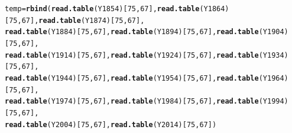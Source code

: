 \documentclass{article}\usepackage[]{graphicx}\usepackage[]{color}
\makeatletter
\newcommand{\hlnum}[1]{\textcolor[rgb]{0.686,0.059,0.569}{#1}}%
\newcommand{\hlstd}[1]{\textcolor[rgb]{0.345,0.345,0.345}{#1}}%
\newcommand{\hlkwb}[1]{\textcolor[rgb]{0.69,0.353,0.396}{#1}}%
\newcommand{\hlkwd}[1]{\textcolor[rgb]{0.737,0.353,0.396}{\textbf{#1}}}%
\newenvironment{kframe}{%
 \def\at@end@of@kframe{}%
 \ifinner\ifhmode%
  \def\at@end@of@kframe{\end{minipage}}%
  \begin{minipage}{\columnwidth}%
 \fi\fi%
 \def\FrameCommand##1{\hskip\@totalleftmargin \hskip-\fboxsep
 \colorbox{shadecolor}{##1}\hskip-\fboxsep
     \hskip-\linewidth \hskip-\@totalleftmargin \hskip\columnwidth}%
 \MakeFramed {\advance\hsize-\width
   \@totalleftmargin\z@ \linewidth\hsize
   \@setminipage}}%
 {\par\unskip\endMakeFramed%
 \at@end@of@kframe}
\newenvironment{knitrout}{}{} %
\makeatother
\begin{document}
\begin{knitrout}
\begin{kframe}
\begin{alltt}
\hlstd{temp} \hlkwb{=} \hlkwd{rbind}\hlstd{(}\hlkwd{read.table}\hlstd{(Y1854)[}\hlnum{75}\hlstd{,}\hlnum{67}\hlstd{],} \hlkwd{read.table}\hlstd{(Y1864)[}\hlnum{75}\hlstd{,}\hlnum{67}\hlstd{],} \hlkwd{read.table}\hlstd{(Y1874)[}\hlnum{75}\hlstd{,}\hlnum{67}\hlstd{],}
\hlkwd{read.table}\hlstd{(Y1884)[}\hlnum{75}\hlstd{,}\hlnum{67}\hlstd{],} \hlkwd{read.table}\hlstd{(Y1894)[}\hlnum{75}\hlstd{,}\hlnum{67}\hlstd{],} \hlkwd{read.table}\hlstd{(Y1904)[}\hlnum{75}\hlstd{,}\hlnum{67}\hlstd{],}
\hlkwd{read.table}\hlstd{(Y1914)[}\hlnum{75}\hlstd{,}\hlnum{67}\hlstd{],} \hlkwd{read.table}\hlstd{(Y1924)[}\hlnum{75}\hlstd{,}\hlnum{67}\hlstd{],} \hlkwd{read.table}\hlstd{(Y1934)[}\hlnum{75}\hlstd{,}\hlnum{67}\hlstd{],}
\hlkwd{read.table}\hlstd{(Y1944)[}\hlnum{75}\hlstd{,}\hlnum{67}\hlstd{],} \hlkwd{read.table}\hlstd{(Y1954)[}\hlnum{75}\hlstd{,}\hlnum{67}\hlstd{],} \hlkwd{read.table}\hlstd{(Y1964)[}\hlnum{75}\hlstd{,}\hlnum{67}\hlstd{],}
\hlkwd{read.table}\hlstd{(Y1974)[}\hlnum{75}\hlstd{,}\hlnum{67}\hlstd{],} \hlkwd{read.table}\hlstd{(Y1984)[}\hlnum{75}\hlstd{,}\hlnum{67}\hlstd{],} \hlkwd{read.table}\hlstd{(Y1994)[}\hlnum{75}\hlstd{,}\hlnum{67}\hlstd{],}
\hlkwd{read.table}\hlstd{(Y2004)[}\hlnum{75}\hlstd{,}\hlnum{67}\hlstd{],} \hlkwd{read.table}\hlstd{(Y2014)[}\hlnum{75}\hlstd{,}\hlnum{67}\hlstd{])}


\end{alltt}
\end{kframe}
\end{knitrout}
\end{document}
